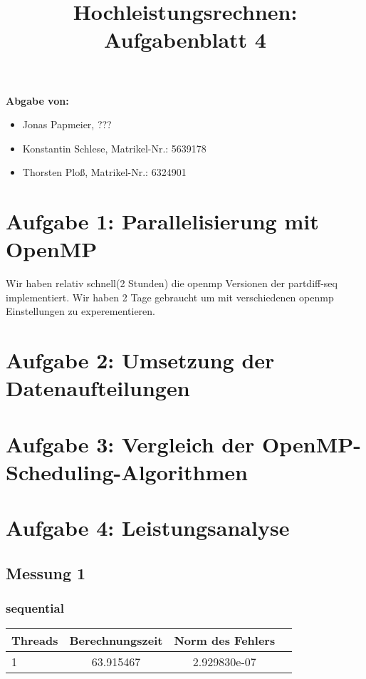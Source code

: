 \documentclass[a4paper]{article}
\title{Hochleistungsrechnen: Aufgabenblatt 4}
\author{}
\date{}
\begin{document}
	\maketitle
	\textbf{Abgabe von:}
	\begin{itemize}
		\item Jonas Papmeier, ???
		\item Konstantin Schlese, Matrikel-Nr.: 5639178
		\item Thorsten Ploß, Matrikel-Nr.: 6324901
	\end{itemize}
	\section*{Aufgabe 1: Parallelisierung mit OpenMP}
	Wir haben relativ schnell(2 Stunden) die openmp Versionen der partdiff-seq implementiert.
	Wir haben 2 Tage gebraucht um mit verschiedenen openmp Einstellungen zu experementieren.
	
	\section*{Aufgabe 2: Umsetzung der Datenaufteilungen}
	\section*{Aufgabe 3: Vergleich der OpenMP-Scheduling-Algorithmen}
	\section*{Aufgabe 4: Leistungsanalyse}
	\subsection*{Messung 1}
	\subsubsection{sequential}
	\begin{center}
		\begin{tabular}{ l | c | c | r } \hline
		 Threads & Berechnungszeit & Norm des Fehlers \\ \hline
		 1 & 63.915467 & 2.929830e-07 \\ \hline
 	     \end{tabular}
	\end{center}
\end{document}

